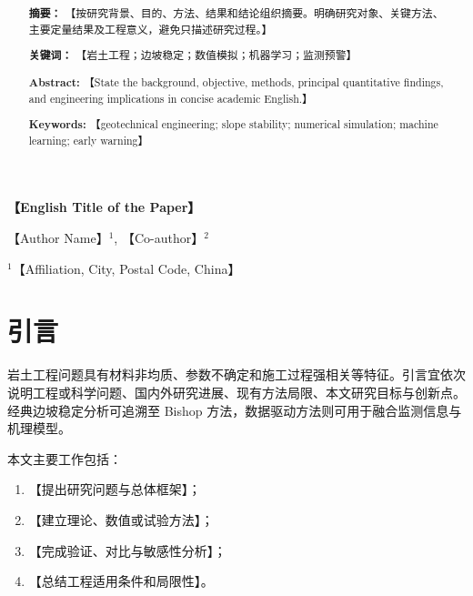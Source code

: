 \documentclass[UTF8,zihao=-5,twoside]{ctexart}
\title{\bfseries\zihao{2} \placeholder{论文题目}}
\author[1]{\zihao{-4} \placeholder{作者姓名}}
\author[2]{\zihao{-4} \placeholder{合作者}}
\affil[1]{\zihao{5} \placeholder{单位名称，城市 邮编}}
\affil[2]{\zihao{5} \placeholder{单位名称，城市 邮编}}
\date{}
\numberwithin{equation}{section}
\newcommand{\placeholder}[1]{\textcolor{paperblack}{【#1】}}
\newcommand{\keywordsname}{关键词：}
\newcommand{\enkeywordsname}{Keywords:}
\begin{document}
\maketitle
\thispagestyle{plain}

\begin{abstract}
\noindent
\textbf{摘要：}
\placeholder{按研究背景、目的、方法、结果和结论组织摘要。明确研究对象、关键方法、主要定量结果及工程意义，避免只描述研究过程。}

\noindent
\textbf{\keywordsname}
\placeholder{岩土工程；边坡稳定；数值模拟；机器学习；监测预警}
\end{abstract}

\vspace{6pt}
\begin{center}
  {\bfseries{} \placeholder{English Title of the Paper}\par}
  \vspace{5pt}
  { \placeholder{Author Name}$^{1}$, \placeholder{Co-author}$^{2}$\par}
  { $^{1}$\placeholder{Affiliation, City, Postal Code, China}\par}
\end{center}

\begin{abstract}
\noindent
\textbf{Abstract:}
\placeholder{State the background, objective, methods, principal quantitative findings, and engineering implications in concise academic English.}

\noindent
\textbf{\enkeywordsname}
\placeholder{geotechnical engineering; slope stability; numerical simulation; machine learning; early warning}
\end{abstract}

\section{引言}

岩土工程问题具有材料非均质、参数不确定和施工过程强相关等特征。引言宜依次说明工程或科学问题、国内外研究进展、现有方法局限、本文研究目标与创新点。经典边坡稳定分析可追溯至 Bishop 方法\cite{bishop1955}，数据驱动方法则可用于融合监测信息与机理模型\cite{example2026}。

本文主要工作包括：
\begin{enumerate}
  \item \placeholder{提出研究问题与总体框架}；
  \item \placeholder{建立理论、数值或试验方法}；
  \item \placeholder{完成验证、对比与敏感性分析}；
  \item \placeholder{总结工程适用条件和局限性}。
\end{enumerate}
\end{document}
